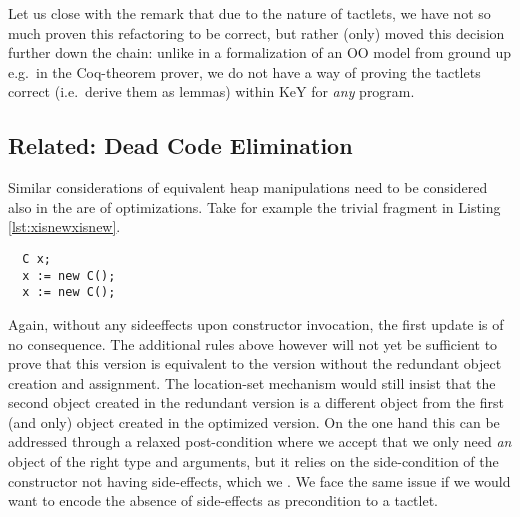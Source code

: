 Let us close with the remark that due to the nature of tactlets, we have not so much proven this refactoring to be correct,
but rather (only) moved this decision further down the chain: unlike in a formalization of an OO model from ground up e.g.\ in the Coq-theorem prover,
we do not have a way of proving the tactlets correct (i.e.\ derive them as lemmas) within KeY for \textit{any} program.

\subsection*{Related: Dead Code Elimination}
Similar considerations of equivalent heap manipulations need to be considered also in the are of optimizations.
Take for example the trivial fragment in Listing \ref{lst:xisnewxisnew}.
\begin{lstlisting}
  C x;
  x := new C();
  x := new C();
\end{lstlisting}
Again, without any sideeffects upon constructor invocation, the first update is of no consequence.
The additional rules above however will not yet be sufficient to prove that this version is equivalent to the version without the redundant object creation and assignment.
The location-set mechanism would still insist that the second object created  in the redundant version is a different object from the first (and only) object created in the optimized version.
On the one hand this can be addressed through a relaxed post-condition where we accept that we only need \textit{an} object of the right type and arguments, but it relies on the side-condition of the constructor not having side-effects, which we .
We face the same issue if we would want to encode the absence of side-effects as precondition to a tactlet.

